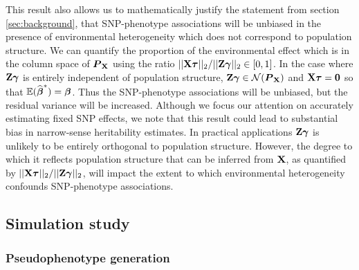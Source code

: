 This result also allows us to mathematically justify the statement from section \ref{sec:background}, that SNP-phenotype associations will be unbiased in the presence of environmental heterogeneity which does not correspond to population structure. We can quantify the proportion of the environmental effect which is in the column space of $\boldsymbol{P}_{\textbf{X}}$ using the ratio $||\textbf{X} \boldsymbol{\tau}||_2 / ||\textbf{Z} \boldsymbol{\gamma}||_2 \in [0, 1]$. In the case where $\textbf{Z} \boldsymbol{\gamma}$ is entirely independent of population structure, $\textbf{Z} \boldsymbol{\gamma} \in \mathcal{N}(\boldsymbol{P}_{\textbf{X}})$ and $\textbf{X} \boldsymbol{\tau} = \boldsymbol{0}$ so that $\mathbb{E}(\widehat{\boldsymbol{\beta}{}}^*) = \boldsymbol{\beta}{}$. Thus the SNP-phenotype associations will be unbiased, but the residual variance will be increased. Although we focus our attention on accurately estimating fixed SNP effects, we note that this result could lead to substantial bias in narrow-sense heritability estimates. In practical applications $\textbf{Z} \boldsymbol{\gamma}$ is unlikely to be entirely orthogonal to population structure. However, the degree to which it reflects population structure that can be inferred from $\textbf{X}$, as quantified by $||\textbf{X} \boldsymbol{\tau}||_2 / ||\textbf{Z} \boldsymbol{\gamma}||_2$, will impact the extent to which environmental heterogeneity confounds SNP-phenotype associations. 

\subsection{Simulation study}
\subsubsection{Pseudophenotype generation}

